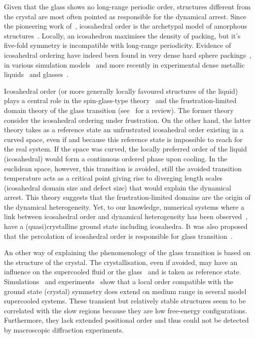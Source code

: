 Given that the glass shows no long-range periodic order, structures different from the crystal are most often pointed as responsible for the dynamical arrest. Since the pioneering work of~\citet{Frank1952}, icosahedral order is the archetypal model of amorphous structures~\citep{Spaepen2000}. Locally, an icosahedron maximises the density of packing, but it's five-fold symmetry is incompatible with long-range periodicity. Evidence of icosahedral ordering have indeed been found in very dense hard sphere packings~\citep{Bernal1960, Clarke1993, Malshe2011}, in various simulation models~\citep{steinhardt1983boo, Tomida1995, Doye2003, Coslovich2007, Pedersen2010, Coslovich2011} and more recently in experimental dense metallic liquids~\citep{Reichert2000, Celino2007} and glasses~\citep{Luo2004, Wang2011}.

Icosahedral order (or more generally locally favoured structures of the liquid) plays a central role in the spin-glass-type theory~\cite{steinhardt1983boo} and the frustration-limited domain theory of the glass transition (see~\citep{tarjus2005fba} for a review). The former theory consider the icosahedral ordering under frustration. On the other hand, the latter theory takes as a reference state an unfrustrated icosahedral order existing in a curved space, even if and because this reference state is impossible to reach for the real system. If the space was curved, the locally preferred order of the liquid (icosahedral) would form a continuous ordered phase upon cooling. In the  euclidean space, however, this transition is avoided, still the avoided transition temperature acts as a critical point giving rise to diverging length scales (icosahedral domain size and defect size) that would explain the dynamical arrest. This theory suggests that the frustration-limited domains are the origin of the dynamical heterogeneity. Yet, to our knowledge, numerical systems where a link between icosahedral order and dynamical heterogeneity has been observed~\citep{Dzugutov2002, Doye2003, Coslovich2007, Pedersen2010, Coslovich2011}, have a (quasi)crystalline ground state including icosahedra. It was also proposed that the percolation of icosahedral order is responsible for glass transition~\cite{Tomida1995}.  

An other way of explaining the phenomenology of the glass transition is based on the structure of the crystal. The crystallisation, even if avoided, may have an influence on the supercooled fluid or the glass~\citep{tanaka1999top, Cavagna2003} and is taken as reference state. Simulations~\cite{kawasaki2007cbd, Kawasaki2010, Pedersen2010, Coslovich2011} and experiments~\citep{watanabe2008} show that a local order compatible with the ground state (crystal) symmetry does extend on medium range in several model supercooled systems. These transient but relatively stable structures seem to be correlated with the slow regions because they are low free-energy configurations. Furthermore, they lack extended positional order and thus could not be detected by macroscopic diffraction experiments.

